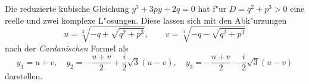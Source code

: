 \documentclass{article}
\begin{document}
Die reduzierte kubische Gleichung $y^3 + 3py +2q = 0$ hat f"ur
$D = q^2 + p^3 > 0$
eine reelle und zwei komplexe L"osungen. Diese lassen sich mit den Abk"urzungen
\[ u = \sqrt[3]{-q + \sqrt{q^2+p^3}},\qquad v = \sqrt[3]{-q - \sqrt{q^2+p^3}} \]
nach der \emph{Cardanischen} Formel als
\[ y_1 = u + v,\quad y_2 = -\frac{u+v}{2} + \frac{i}{2}\sqrt{3}(u - v),\quad
   y_3 = -\frac{u+v}{2} - \frac{i}{2}\sqrt{3}(u-v) \]
darstellen.
\end{document}
